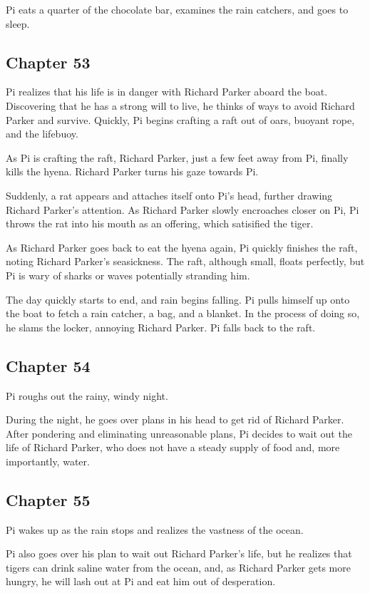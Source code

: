 \documentclass[11pt]{article}
\begin{document}
Pi eats a quarter of the chocolate bar, examines the rain catchers, and goes to sleep.
\subsection{Chapter 53}
\label{sec:org96bb08c}
Pi realizes that his life is in danger with Richard Parker aboard the boat. Discovering that he has a strong will to live, he thinks of ways to avoid Richard Parker and survive. Quickly, Pi begins crafting a raft out of oars, buoyant rope, and the lifebuoy.

As Pi is crafting the raft, Richard Parker, just a few feet away from Pi, finally kills the hyena. Richard Parker turns his gaze towards Pi.

Suddenly, a rat appears and attaches itself onto Pi's head, further drawing Richard Parker's attention. As Richard Parker slowly encroaches closer on Pi, Pi throws the rat into his mouth as an offering, which satisified the tiger.

As Richard Parker goes back to eat the hyena again, Pi quickly finishes the raft, noting Richard Parker's seasickness. The raft, although small, floats perfectly, but Pi is wary of sharks or waves potentially stranding him.

The day quickly starts to end, and rain begins falling. Pi pulls himself up onto the boat to fetch a rain catcher, a bag, and a blanket. In the process of doing so, he slams the locker, annoying Richard Parker. Pi falls back to the raft.
\subsection{Chapter 54}
\label{sec:org8f2a219}
Pi roughs out the rainy, windy night.

During the night, he goes over plans in his head to get rid of Richard Parker. After pondering and eliminating unreasonable plans, Pi decides to wait out the life of Richard Parker, who does not have a steady supply of food and, more importantly, water.
\subsection{Chapter 55}
\label{sec:org6a5dc94}
Pi wakes up as the rain stops and realizes the vastness of the ocean.

Pi also goes over his plan to wait out Richard Parker's life, but he realizes that tigers can drink saline water from the ocean, and, as Richard Parker gets more hungry, he will lash out at Pi and eat him out of desperation.
\end{document}
